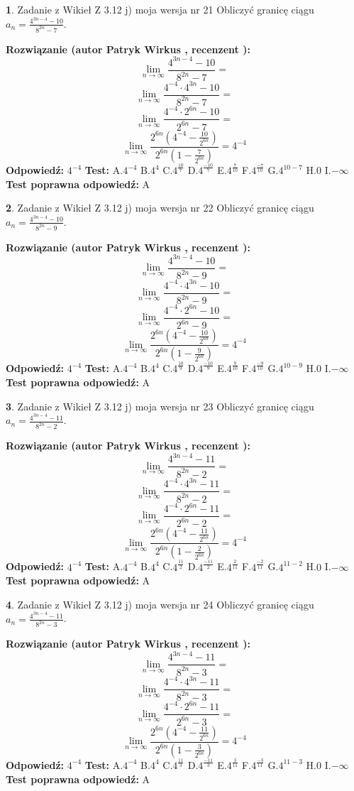 \documentclass[12pt, a4paper]{article}
\theoremstyle{definition} %
\newtheorem{zad}{}
\newcommand{\zadStart}[1]{\begin{zad}#1\newline}
\newcommand{\zadStop}{\end{zad}}
\newcommand{\rozwStart}[2]{\noindent \textbf{Rozwiązanie (autor #1 , recenzent #2): }\newline}
\newcommand{\rozwStop}{\newline}
\newcommand{\odpStart}{\noindent \textbf{Odpowiedź:}\newline}
\newcommand{\odpStop}{\newline}
\newcommand{\testStart}{\noindent \textbf{Test:}\newline}
\newcommand{\testStop}{\newline}
\newcommand{\kluczStart}{\noindent \textbf{Test poprawna odpowiedź:}\newline}
\newcommand{\kluczStop}{\newline}
\begin{document}
\zadStart{Zadanie z Wikieł Z 3.12 j) moja wersja nr 21}
Obliczyć granicę ciągu $a_{n}=\frac{4^{3n-4}-10}{8^{2n}-7}$.
\zadStop
\rozwStart{Patryk Wirkus}{}
$$\lim\limits_{n\to\infty}\frac{4^{3n-4}-10}{8^{2n}-7}=$$
$$\lim\limits_{n\to\infty}\frac{4^{-4} \cdot 4^{3n}-10}{8^{2n}-7}=$$
$$\lim\limits_{n\to\infty}\frac{4^{-4} \cdot 2^{6n}-10}{2^{6n}-7}=$$
$$\lim\limits_{n\to\infty}\frac{2^{6n}(4^{-4} - \frac{10}{2^{6n}})}{2^{6n}(1-\frac{7}{2^{6n}})}= 4^{-4}$$
\rozwStop
\odpStart
$4^{-4}$
\odpStop
\testStart
A.$4^{-4}$
B.$4^{4}$
C.$4^{\frac{10}{7}}$
D.$4^{\frac{-10}{7}}$
E.$4^{\frac{7}{10}}$
F.$4^{\frac{-7}{10}}$
G.$4^{10-7}$
H.$0$
I.$-\infty$
\testStop
\kluczStart
A
\kluczStop



\zadStart{Zadanie z Wikieł Z 3.12 j) moja wersja nr 22}
Obliczyć granicę ciągu $a_{n}=\frac{4^{3n-4}-10}{8^{2n}-9}$.
\zadStop
\rozwStart{Patryk Wirkus}{}
$$\lim\limits_{n\to\infty}\frac{4^{3n-4}-10}{8^{2n}-9}=$$
$$\lim\limits_{n\to\infty}\frac{4^{-4} \cdot 4^{3n}-10}{8^{2n}-9}=$$
$$\lim\limits_{n\to\infty}\frac{4^{-4} \cdot 2^{6n}-10}{2^{6n}-9}=$$
$$\lim\limits_{n\to\infty}\frac{2^{6n}(4^{-4} - \frac{10}{2^{6n}})}{2^{6n}(1-\frac{9}{2^{6n}})}= 4^{-4}$$
\rozwStop
\odpStart
$4^{-4}$
\odpStop
\testStart
A.$4^{-4}$
B.$4^{4}$
C.$4^{\frac{10}{9}}$
D.$4^{\frac{-10}{9}}$
E.$4^{\frac{9}{10}}$
F.$4^{\frac{-9}{10}}$
G.$4^{10-9}$
H.$0$
I.$-\infty$
\testStop
\kluczStart
A
\kluczStop



\zadStart{Zadanie z Wikieł Z 3.12 j) moja wersja nr 23}
Obliczyć granicę ciągu $a_{n}=\frac{4^{3n-4}-11}{8^{2n}-2}$.
\zadStop
\rozwStart{Patryk Wirkus}{}
$$\lim\limits_{n\to\infty}\frac{4^{3n-4}-11}{8^{2n}-2}=$$
$$\lim\limits_{n\to\infty}\frac{4^{-4} \cdot 4^{3n}-11}{8^{2n}-2}=$$
$$\lim\limits_{n\to\infty}\frac{4^{-4} \cdot 2^{6n}-11}{2^{6n}-2}=$$
$$\lim\limits_{n\to\infty}\frac{2^{6n}(4^{-4} - \frac{11}{2^{6n}})}{2^{6n}(1-\frac{2}{2^{6n}})}= 4^{-4}$$
\rozwStop
\odpStart
$4^{-4}$
\odpStop
\testStart
A.$4^{-4}$
B.$4^{4}$
C.$4^{\frac{11}{2}}$
D.$4^{\frac{-11}{2}}$
E.$4^{\frac{2}{11}}$
F.$4^{\frac{-2}{11}}$
G.$4^{11-2}$
H.$0$
I.$-\infty$
\testStop
\kluczStart
A
\kluczStop



\zadStart{Zadanie z Wikieł Z 3.12 j) moja wersja nr 24}
Obliczyć granicę ciągu $a_{n}=\frac{4^{3n-4}-11}{8^{2n}-3}$.
\zadStop
\rozwStart{Patryk Wirkus}{}
$$\lim\limits_{n\to\infty}\frac{4^{3n-4}-11}{8^{2n}-3}=$$
$$\lim\limits_{n\to\infty}\frac{4^{-4} \cdot 4^{3n}-11}{8^{2n}-3}=$$
$$\lim\limits_{n\to\infty}\frac{4^{-4} \cdot 2^{6n}-11}{2^{6n}-3}=$$
$$\lim\limits_{n\to\infty}\frac{2^{6n}(4^{-4} - \frac{11}{2^{6n}})}{2^{6n}(1-\frac{3}{2^{6n}})}= 4^{-4}$$
\rozwStop
\odpStart
$4^{-4}$
\odpStop
\testStart
A.$4^{-4}$
B.$4^{4}$
C.$4^{\frac{11}{3}}$
D.$4^{\frac{-11}{3}}$
E.$4^{\frac{3}{11}}$
F.$4^{\frac{-3}{11}}$
G.$4^{11-3}$
H.$0$
I.$-\infty$
\testStop
\kluczStart
A
\kluczStop
\end{document}
